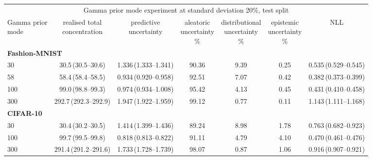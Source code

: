 \begin{tabular}{lcccccc}
\toprule
\multicolumn{7}{c}{Gamma prior mode experiment at standard deviation 20\%, test split} \\
\shortstack{Gamma prior\\mode} & \shortstack{realised total\\concentration} & \shortstack{predictive\\uncertainty} & \shortstack{aleatoric\\uncertainty\\\%} & \shortstack{distributional\\uncertainty\\\%} & \shortstack{epistemic\\uncertainty\\\%} & NLL \\
\midrule
\multicolumn{7}{l}{\textbf{Fashion-MNIST}} \\
\midrule
30 & 30.5\,(30.5--30.6) & 1.336\,(1.333--1.341) & 90.36 & 9.39 & 0.25 & 0.535\,(0.529--0.545) \\
58 & 58.4\,(58.4--58.5) & 0.934\,(0.920--0.958) & 92.51 & 7.07 & 0.42 & 0.382\,(0.373--0.399) \\
100 & 99.0\,(98.8--99.3) & 0.974\,(0.934--1.008) & 95.42 & 4.13 & 0.45 & 0.431\,(0.410--0.458) \\
300 & 292.7\,(292.3--292.9) & 1.947\,(1.922--1.959) & 99.12 & 0.77 & 0.11 & 1.143\,(1.111--1.168) \\
\midrule
\multicolumn{7}{l}{\textbf{CIFAR-10}} \\
\midrule
30 & 30.4\,(30.2--30.5) & 1.414\,(1.399--1.436) & 89.24 & 8.98 & 1.78 & 0.763\,(0.682--0.923) \\
100 & 99.7\,(99.5--99.8) & 0.818\,(0.813--0.822) & 91.11 & 4.79 & 4.10 & 0.470\,(0.461--0.476) \\
300 & 291.4\,(291.2--291.6) & 1.733\,(1.728--1.739) & 98.07 & 0.87 & 1.06 & 0.916\,(0.907--0.921) \\
\bottomrule
\end{tabular}

